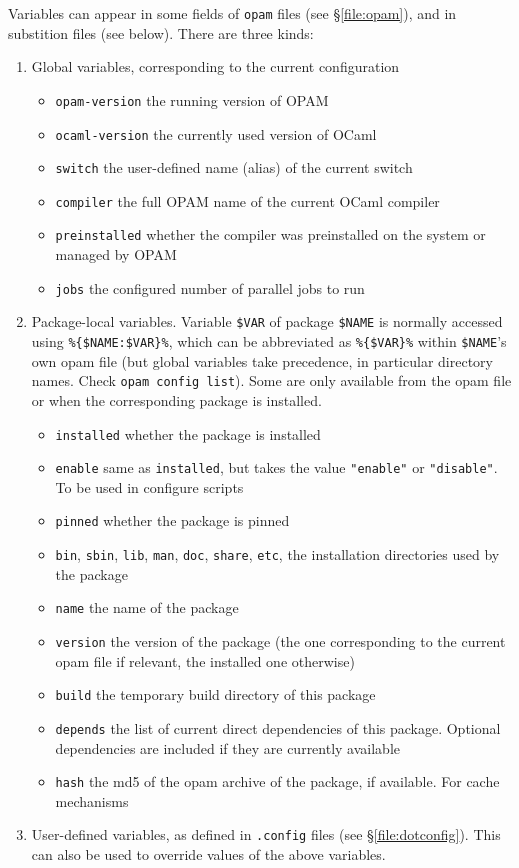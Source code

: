 \documentclass[a4paper,10pt]{article}
\begin{document}
Variables can appear in some fields of {\tt opam} files (see \S\ref{file:opam}),
and in substition files (see below). There are three kinds:
\begin{enumerate}
\item Global variables, corresponding to the current configuration
  \begin{itemize}
  \item \verb+opam-version+ the running version of OPAM
  \item \verb+ocaml-version+ the currently used version of OCaml
  \item \verb+switch+ the user-defined name (alias) of the current switch
  \item \verb+compiler+ the full OPAM name of the current OCaml compiler
  \item \verb+preinstalled+ whether the compiler was preinstalled on the system or managed by OPAM
  \item \verb+jobs+ the configured number of parallel jobs to run
  \end{itemize}
\item Package-local variables. Variable \verb+$VAR+ of package \verb+$NAME+ is
  normally accessed using \verb+%{$NAME:$VAR}%+, which can be abbreviated as
  \verb+%{$VAR}%+ within \verb+$NAME+'s own opam file (but global variables take
  precedence, in particular directory names. Check \verb+opam config list+).
  Some are only available from the opam file or when the corresponding package
  is installed.
  \begin{itemize}
  \item \verb+installed+ whether the package is installed
  \item \verb+enable+ same as \verb+installed+, but takes the value
    \verb+"enable"+ or \verb+"disable"+. To be used in configure scripts
  \item \verb+pinned+ whether the package is pinned
  \item \verb+bin+, \verb+sbin+, \verb+lib+, \verb+man+, \verb+doc+,
    \verb+share+, \verb+etc+, the installation directories used by the package
  \item \verb+name+ the name of the package
  \item \verb+version+ the version of the package (the one corresponding to the
    current opam file if relevant, the installed one otherwise)
  \item \verb+build+ the temporary build directory of this package
  \item \verb+depends+ the list of current direct dependencies of this package.
    Optional dependencies are included if they are currently available
  \item \verb+hash+ the md5 of the opam archive of the package, if available.
    For cache mechanisms
  \end{itemize}
\item User-defined variables, as defined in {\tt *.config} files (see
  \S\ref{file:dotconfig}). This can also be used to override values of the above
  variables.
\end{enumerate}
\end{document}
